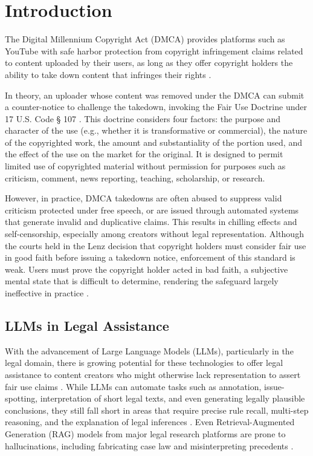 \section{Introduction}

The Digital Millennium Copyright Act (DMCA) provides platforms such as YouTube with safe harbor protection from copyright infringement claims related to content uploaded by their users, as long as they offer copyright holders the ability to take down content that infringes their rights \cite{16_DMCA}.

In theory, an uploader whose content was removed under the DMCA can submit a counter-notice to challenge the takedown, invoking the Fair Use Doctrine under 17 U.S. Code § 107 \cite{15_USC107}. This doctrine considers four factors: the purpose and character of the use (e.g., whether it is transformative or commercial), the nature of the copyrighted work, the amount and substantiality of the portion used, and the effect of the use on the market for the original. It is designed to permit limited use of copyrighted material without permission for purposes such as criticism, comment, news reporting, teaching, scholarship, or research.

However, in practice, DMCA takedowns are often abused to suppress valid criticism protected under free speech, or are issued through automated systems that generate invalid and duplicative claims. This results in chilling effects and self-censorship, especially among creators without legal representation. Although the courts held in the Lenz decision that copyright holders must consider fair use in good faith before issuing a takedown notice, enforcement of this standard is weak. Users must prove the copyright holder acted in bad faith, a subjective mental state that is difficult to determine, rendering the safeguard largely ineffective in practice \cite{21a_DMCAAbuse, 21b_DMCAAbuse}.

\subsection{LLMs in Legal Assistance}

With the advancement of Large Language Models (LLMs), particularly in the legal domain, there is growing potential for these technologies to offer legal assistance to content creators who might otherwise lack representation to assert fair use claims \cite{10_LLMFewShotLearner, 20_LLMSurvey, 05_BuildingJusticeBot}. While LLMs can automate tasks such as annotation, issue-spotting, interpretation of short legal texts, and even generating legally plausible conclusions, they still fall short in areas that require precise rule recall, multi-step reasoning, and the explanation of legal inferences \cite{06_GPTAnnotateTextualData, 22_LegalBench}. Even Retrieval-Augmented Generation (RAG) models from major legal research platforms are prone to hallucinations, including fabricating case law and misinterpreting precedents \cite{04_LegalHallucination, 04b_HallucinationFree}.

